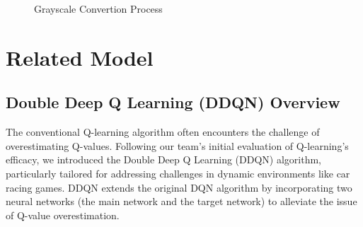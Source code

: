 \documentclass{article}
\begin{document}
\begin{figure}[ht!]
  \centering
  \caption{Grayscale Convertion Process}
\end{figure}


\section{Related Model}
\label{headings}

\subsection{Double Deep Q Learning (DDQN) Overview}

The conventional Q-learning algorithm often encounters the challenge of overestimating Q-values. Following our team's initial evaluation of Q-learning's efficacy, we introduced the Double Deep Q Learning (DDQN) algorithm, particularly tailored for addressing challenges in dynamic environments like car racing games. DDQN extends the original DQN algorithm by incorporating two neural networks (the main network and the target network) to alleviate the issue of Q-value overestimation.
\end{document}
